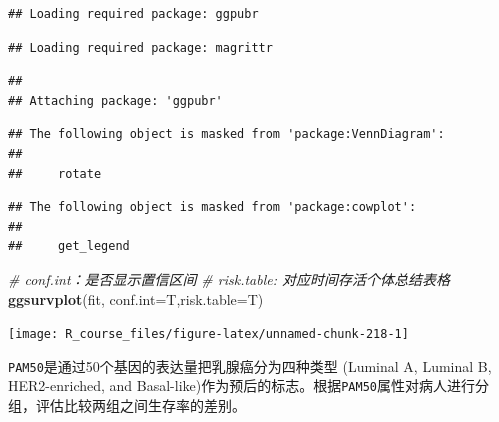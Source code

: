 \documentclass[]{article}
\newenvironment{Shaded}{\begin{snugshade}}{\end{snugshade}}
\newcommand{\KeywordTok}[1]{\textcolor[rgb]{0.13,0.29,0.53}{\textbf{{#1}}}}
\newcommand{\DataTypeTok}[1]{\textcolor[rgb]{0.13,0.29,0.53}{{#1}}}
\newcommand{\StringTok}[1]{\textcolor[rgb]{0.31,0.60,0.02}{{#1}}}
\newcommand{\CommentTok}[1]{\textcolor[rgb]{0.56,0.35,0.01}{\textit{{#1}}}}
\newcommand{\NormalTok}[1]{{#1}}
\numberwithin{figure}{section}
\numberwithin{table}{section}
\theoremstyle{definition}
\theoremstyle{definition}
\theoremstyle{definition}
\theoremstyle{remark}
\begin{document}
\begin{verbatim}
## Loading required package: ggpubr
\end{verbatim}

\begin{verbatim}
## Loading required package: magrittr
\end{verbatim}

\begin{verbatim}
## 
## Attaching package: 'ggpubr'
\end{verbatim}

\begin{verbatim}
## The following object is masked from 'package:VennDiagram':
## 
##     rotate
\end{verbatim}

\begin{verbatim}
## The following object is masked from 'package:cowplot':
## 
##     get_legend
\end{verbatim}

\begin{Shaded}
\begin{Highlighting}[]
\CommentTok{# conf.int：是否显示置信区间}
\CommentTok{# risk.table: 对应时间存活个体总结表格}
\KeywordTok{ggsurvplot}\NormalTok{(fit, }\DataTypeTok{conf.int=}\NormalTok{T,}\DataTypeTok{risk.table=}\NormalTok{T)}
\end{Highlighting}
\end{Shaded}

\begin{center}\texttt{[image: R\_course\_files/figure-latex/unnamed-chunk-218-1]} \end{center}

\texttt{PAM50}是通过50个基因的表达量把乳腺癌分为四种类型 (Luminal A,
Luminal B, HER2-enriched, and
Basal-like)作为预后的标志。根据\texttt{PAM50}属性对病人进行分组，评估比较两组之间生存率的差别。

\begin{Shaded}
\end{Shaded}
\end{document}
